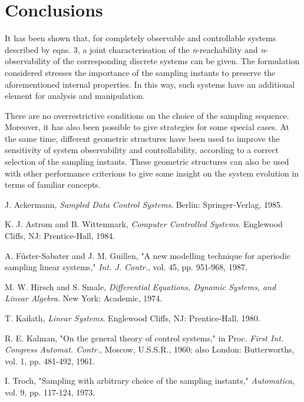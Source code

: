 \documentclass{article}
\begin{document}
\section{Conclusions}
It has been shown that, for completely observable and controllable
systems described by eqns. 3, a joint characterisation of the
\textit{n}-reachability and \textit{n}-observability of the
corresponding discrete systems can be given. The formulation
considered stresses the importance of the sampling instants to
preserve the aforementioned internal properties. In this way, such
systems have an additional element for analysis and manipulation.

There are no overrestrictive conditions on the choice of the
sampling sequence. Moreover, it has also been possible to give
strategies for some special cases. At the same time, different
geometric structures have been used to improve the sensitivity of
system observability and controllability, according to a correct
selection of the sampling instants. These geometric structures can
also be used with other performance criterions to give some
insight on the system evolution in terms of familiar concepts.

\begin{thebibliography}{9}

 J. Ackermann, \textit{Sampled Data Control Systems}. Berlin:
Springer-Verlag, 1985.

 K. J. Astrom and B. Wittenmark, \textit{Computer Controlled Systems}.
Englewood Cliffs, NJ: Prentice-Hall, 1984.

 A. F\'uster-Sabater and J. M. Guillen, "A new modelling technique for
aperiodic sampling linear systems," \textit{Int. J. Contr.}, vol.
45, pp. 951-968, 1987.

 M. W. Hirsch and S. Smale, \textit{Differential Equations, Dynamic
Systems, and Linear Algebra}. New York: Academic, 1974.

 T. Kailath, \textit{Linear Systems}. Englewood
Cliffs, NJ: Prentice-Hall, 1980.

 R. E. Kalman, "On the general theory of control systems," in
Proc. \textit{First Int. Congress Automat. Contr.}, Moscow,
U.S.S.R., 1960; also London: Butterworths, vol. 1, pp.
481-492, 1961.

 I. Troch, "Sampling with arbitrary choice of the sampling
instants," \textit{Automatica}, vol. 9, pp. 117-124, 1973.

\end{thebibliography}
\end{document}
